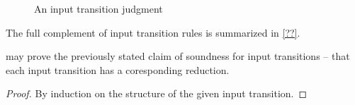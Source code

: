 
\begin{figure}[tbp]
  \caption{An input transition judgment}\label{fig:formula-as-process:ireduces}
\end{figure}

The full complement of input transition rules is summarized in \cref{??}.

 may prove the previously stated claim of soundness for input transitions -- that each input transition has a coresponding reduction.
%
\ireducessoundness
\begin{proof}
  By induction on the structure of the given input transition.
\end{proof}

